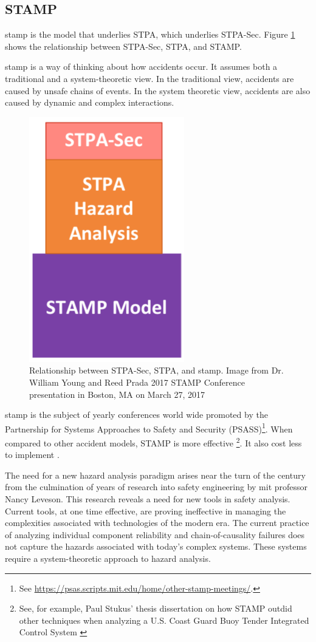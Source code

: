 \documentclass[../../main/main.tex]{subfiles}
\begin{document}
\subsection{STAMP}\label{ssec:stamp}
\Gls{stamp} is the model that underlies STPA, which underlies STPA-Sec.  Figure \ref{stampstpa} shows the relationship between STPA-Sec, STPA, and STAMP.


\gls{stamp} is a way of thinking about how accidents occur.  It assumes both a traditional and a system-theoretic view.  In the traditional view, accidents are caused by unsafe chains of events.  In the system theoretic view, accidents are also caused by dynamic and complex interactions. 


\begin{figure}[h!]
\centering
\includegraphics[width=0.3\linewidth]{../figures/stampstpa}
\caption{\label{stampstpa}Relationship between STPA-Sec, STPA, and \gls{stamp}.  Image from Dr. William Young and Reed Prada 2017 STAMP Conference presentation in Boston, MA on March 27, 2017 \cite{youngPorada} }
\end{figure}

\gls{stamp} is the subject of yearly conferences world wide promoted by the Partnership for Systems Approaches to Safety and Security (PSASS)\footnote{See \url{https://psas.scripts.mit.edu/home/other-stamp-meetings/}.}.  When compared to other accident models, STAMP is more effective \footnote{See, for example, Paul Stukus' thesis dissertation on how STAMP outdid other techniques when analyzing a U.S. Coast Guard Buoy Tender Integrated Control System \cite{buoy}}.  It also cost less to implement \cite{stpa}.

The need for a new hazard analysis paradigm arises near the turn of the century from the culmination of years of research into safety engineering by \gls{mit} professor Nancy Leveson.  This research reveals a need for new tools in safety analysis.  Current tools, at one time effective, are proving ineffective in managing the complexities associated with technologies of the modern era.  The current practice of analyzing individual component reliability and chain-of-causality failures does not capture the hazards associated with today's complex systems.  These systems require a system-theoretic approach to hazard analysis. 
\end{document}
